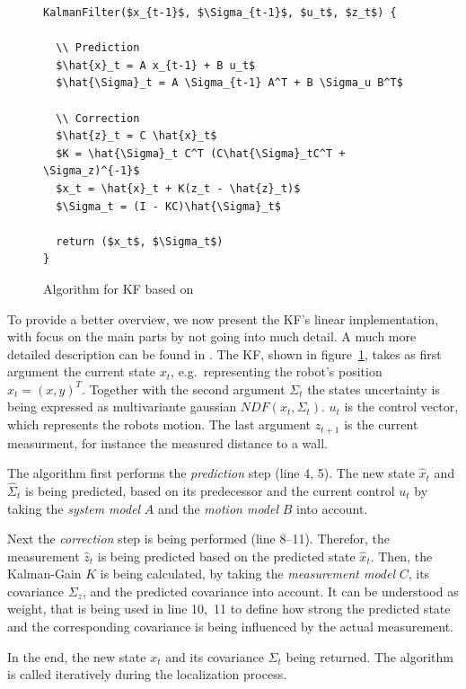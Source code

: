 \begin{figure}
\begin{lstlisting}[mathescape]
KalmanFilter($x_{t-1}$, $\Sigma_{t-1}$, $u_t$, $z_t$) {
	
  \\ Prediction
  $\hat{x}_t = A x_{t-1} + B u_t$
  $\hat{\Sigma}_t = A \Sigma_{t-1} A^T + B \Sigma_u B^T$

  \\ Correction
  $\hat{z}_t = C \hat{x}_t$
  $K = \hat{\Sigma}_t C^T (C\hat{\Sigma}_tC^T + \Sigma_z)^{-1}$
  $x_t = \hat{x}_t + K(z_t - \hat{z}_t)$
  $\Sigma_t = (I - KC)\hat{\Sigma}_t$
  
  return ($x_t$, $\Sigma_t$)
}
\end{lstlisting}
\caption{Algorithm for \acl{KF} based on \citet{thrun:prob_robo}}
\label{lst:kf}
\end{figure}

To provide a better overview, we now present the \acs{KF}'s linear implementation, with focus on the main parts by not going into much detail. A much more detailed description can be found in \citet{thrun:prob_robo}. 
The \acs{KF}, shown in figure~\ref{lst:kf}, takes as first argument the current state $x_t$, e.g.\ representing the robot's position $x_t = (x, y)^T$. Together with the second argument $\Sigma_t$ the states uncertainty is being expressed as multivariante gaussian $NDF(x_t, \Sigma_t)$. $u_t$ is the control vector, which represents the robots motion. The last argument $z_{t+1}$ is the current measurment, for instance the measured distance to a wall.

The algorithm first performs the \emph{prediction} step (line 4, 5). The new state $\hat{x}_t$ and $\hat{\Sigma}_t$ is being predicted, based on its predecessor and the current control $u_t$ by taking the \emph{system model} $A$ and the \emph{motion model} $B$ into account.

Next the \emph{correction} step is being performed (line 8--11). Therefor, the measurement $\hat{z}_t$ is being predicted based on the predicted state $\hat{x}_t$. Then, the Kalman-Gain $K$ is being calculated, by taking the \emph{measurement model} $C$, its covariance $\Sigma_z$, and the predicted covariance into account. It can be understood as weight, that is being used in line 10,~11 to define how strong the predicted  state and the corresponding covariance is being influenced by the actual measurement.

In the end, the new state $x_t$ and its covariance $\Sigma_t$ being returned. The algorithm is called iteratively during the localization process.

